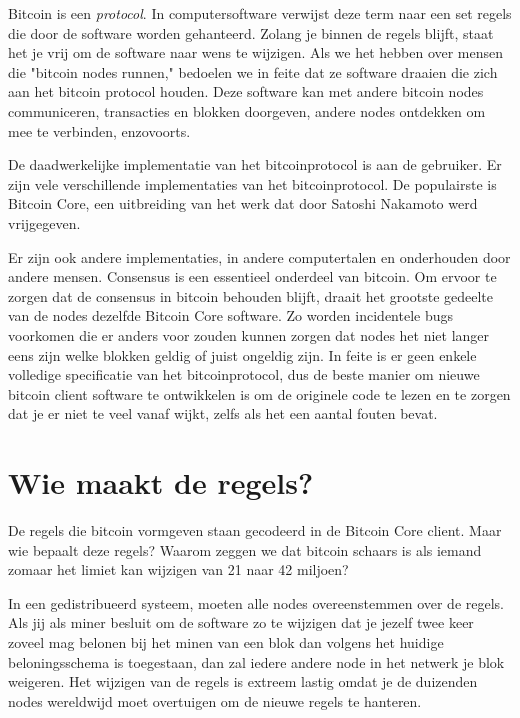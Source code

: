 \documentclass[
  letterpaper,
]{scrbook}
\begin{document}
Bitcoin is een \emph{protocol}. In computersoftware verwijst deze term
naar een set regels die door de software worden gehanteerd. Zolang je
binnen de regels blijft, staat het je vrij om de software naar wens te
wijzigen. Als we het hebben over mensen die "bitcoin nodes runnen,"
bedoelen we in feite dat ze software draaien die zich aan het bitcoin
protocol houden. Deze software kan met andere bitcoin nodes
communiceren, transacties en blokken doorgeven, andere nodes ontdekken
om mee te verbinden, enzovoorts.

De daadwerkelijke implementatie van het bitcoinprotocol is aan de
gebruiker. Er zijn vele verschillende implementaties van het
bitcoinprotocol. De populairste is Bitcoin Core, een uitbreiding van het
werk dat door Satoshi Nakamoto werd vrijgegeven.

Er zijn ook andere implementaties, in andere computertalen en
onderhouden door andere mensen. Consensus is een essentieel onderdeel
van bitcoin. Om ervoor te zorgen dat de consensus in bitcoin behouden
blijft, draait het grootste gedeelte van de nodes dezelfde Bitcoin Core
software. Zo worden incidentele bugs voorkomen die er anders voor zouden
kunnen zorgen dat nodes het niet langer eens zijn welke blokken geldig
of juist ongeldig zijn. In feite is er geen enkele volledige
specificatie van het bitcoinprotocol, dus de beste manier om nieuwe
bitcoin client software te ontwikkelen is om de originele code te lezen
en te zorgen dat je er niet te veel vanaf wijkt, zelfs als het een
aantal fouten bevat.

\hypertarget{wie-maakt-de-regels}{%
\section{Wie maakt de regels?}\label{wie-maakt-de-regels}}

De regels die bitcoin vormgeven staan gecodeerd in de Bitcoin Core
client. Maar wie bepaalt deze regels? Waarom zeggen we dat bitcoin
schaars is als iemand zomaar het limiet kan wijzigen van 21 naar 42
miljoen?

In een gedistribueerd systeem, moeten alle nodes overeenstemmen over de
regels. Als jij als miner besluit om de software zo te wijzigen dat je
jezelf twee keer zoveel mag belonen bij het minen van een blok dan
volgens het huidige beloningsschema is toegestaan, dan zal iedere andere
node in het netwerk je blok weigeren. Het wijzigen van de regels is
extreem lastig omdat je de duizenden nodes wereldwijd moet overtuigen om
de nieuwe regels te hanteren.
\end{document}
